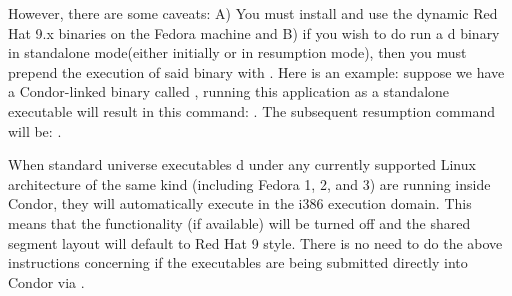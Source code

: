 However, there are some caveats: A) You must install and use the dynamic
Red Hat 9.x binaries on the Fedora machine and B) if you wish to do
run a d binary in standalone mode(either initially
or in resumption mode), then you must prepend the execution of said
binary with . Here is an example: suppose we have a
Condor-linked binary called , running this application as a
standalone executable will result in this command: . The subsequent resumption command will be: 
.

When standard universe executables d under any currently
supported Linux architecture of the same kind (including Fedora 1,
2, and 3) are running inside Condor, they will automatically execute
in the i386 execution domain. This means that the 
functionality (if available) will be turned off and the shared segment
layout will default to Red Hat 9 style. There is no need to do the
above instructions concerning  if the executables are
being submitted directly into Condor via .





